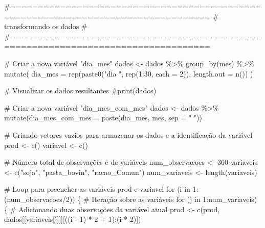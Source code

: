 \documentclass[
  letterpaper,
  DIV=11,
  numbers=noendperiod]{scrartcl}
\newenvironment{Shaded}{\begin{snugshade}}{\end{snugshade}}
\newcommand{\AttributeTok}[1]{\textcolor[rgb]{0.40,0.45,0.13}{#1}}
\newcommand{\CommentTok}[1]{\textcolor[rgb]{0.37,0.37,0.37}{#1}}
\newcommand{\ControlFlowTok}[1]{\textcolor[rgb]{0.00,0.23,0.31}{#1}}
\newcommand{\DecValTok}[1]{\textcolor[rgb]{0.68,0.00,0.00}{#1}}
\newcommand{\FunctionTok}[1]{\textcolor[rgb]{0.28,0.35,0.67}{#1}}
\newcommand{\NormalTok}[1]{\textcolor[rgb]{0.00,0.23,0.31}{#1}}
\newcommand{\OtherTok}[1]{\textcolor[rgb]{0.00,0.23,0.31}{#1}}
\newcommand{\SpecialCharTok}[1]{\textcolor[rgb]{0.37,0.37,0.37}{#1}}
\newcommand{\StringTok}[1]{\textcolor[rgb]{0.13,0.47,0.30}{#1}}
\begin{document}
\begin{Shaded}
\begin{Highlighting}[]
\CommentTok{\#==================================================================================}
\CommentTok{\#                      transformando os dados                                    \#}
\CommentTok{\#==================================================================================}


\CommentTok{\# Criar a nova variável "dia\_mes"}
\NormalTok{dados }\OtherTok{\textless{}{-}}\NormalTok{ dados }\SpecialCharTok{\%\textgreater{}\%}
  \FunctionTok{group\_by}\NormalTok{(mes) }\SpecialCharTok{\%\textgreater{}\%}
  \FunctionTok{mutate}\NormalTok{(}
    \AttributeTok{dia\_mes =} \FunctionTok{rep}\NormalTok{(}\FunctionTok{paste0}\NormalTok{(}\StringTok{"dia "}\NormalTok{, }\FunctionTok{rep}\NormalTok{(}\DecValTok{1}\SpecialCharTok{:}\DecValTok{30}\NormalTok{, }\AttributeTok{each =} \DecValTok{2}\NormalTok{)), }\AttributeTok{length.out =} \FunctionTok{n}\NormalTok{())}
\NormalTok{  )}

\CommentTok{\# Visualizar os dados resultantes}
\CommentTok{\#print(dados)}



\CommentTok{\# Criar a nova variável "dia\_mes\_com\_mes"}
\NormalTok{dados }\OtherTok{\textless{}{-}}\NormalTok{ dados }\SpecialCharTok{\%\textgreater{}\%}
  \FunctionTok{mutate}\NormalTok{(}\AttributeTok{dia\_mes\_com\_mes =} \FunctionTok{paste}\NormalTok{(dia\_mes, mes, }\AttributeTok{sep =} \StringTok{" "}\NormalTok{))}

\CommentTok{\# Criando vetores vazios para armazenar os dados e a identificação da variável}
\NormalTok{prod }\OtherTok{\textless{}{-}} \FunctionTok{c}\NormalTok{()}
\NormalTok{variavel }\OtherTok{\textless{}{-}} \FunctionTok{c}\NormalTok{()}

\CommentTok{\# Número total de observações e de variáveis}
\NormalTok{num\_observacoes }\OtherTok{\textless{}{-}} \DecValTok{360}
\NormalTok{variaveis }\OtherTok{\textless{}{-}} \FunctionTok{c}\NormalTok{(}\StringTok{"soja"}\NormalTok{, }\StringTok{"pasta\_bovin"}\NormalTok{, }\StringTok{"racao\_Comun"}\NormalTok{)}
\NormalTok{num\_variaveis }\OtherTok{\textless{}{-}} \FunctionTok{length}\NormalTok{(variaveis)}

\CommentTok{\# Loop para preencher as variáveis prod e variavel}
\ControlFlowTok{for}\NormalTok{ (i }\ControlFlowTok{in} \DecValTok{1}\SpecialCharTok{:}\NormalTok{(num\_observacoes}\SpecialCharTok{/}\DecValTok{2}\NormalTok{)) \{}
  \CommentTok{\# Iteração sobre as variáveis}
  \ControlFlowTok{for}\NormalTok{ (j }\ControlFlowTok{in} \DecValTok{1}\SpecialCharTok{:}\NormalTok{num\_variaveis) \{}
    \CommentTok{\# Adicionando duas observações da variável atual}
\NormalTok{    prod }\OtherTok{\textless{}{-}} \FunctionTok{c}\NormalTok{(prod, dados[[variaveis[j]]][((i }\SpecialCharTok{{-}} \DecValTok{1}\NormalTok{) }\SpecialCharTok{*} \DecValTok{2} \SpecialCharTok{+} \DecValTok{1}\NormalTok{)}\SpecialCharTok{:}\NormalTok{(i }\SpecialCharTok{*} \DecValTok{2}\NormalTok{)])}
    

\end{Highlighting}
\end{Shaded}
\end{document}
